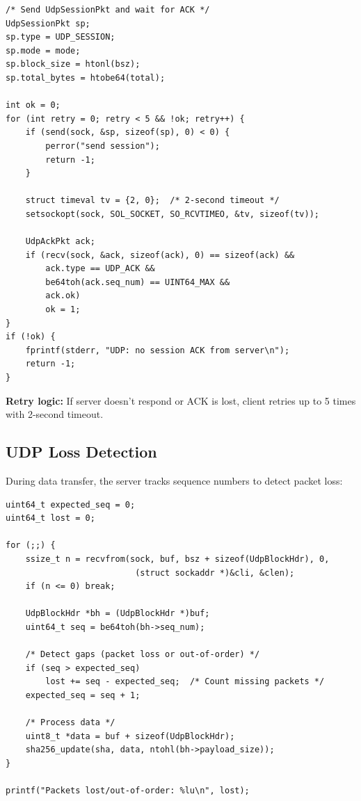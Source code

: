 \documentclass[12pt,a4paper]{article}
\begin{document}
\begin{lstlisting}[caption=UDP Client Session Handshake,label=lst:udp_handshake]
/* Send UdpSessionPkt and wait for ACK */
UdpSessionPkt sp;
sp.type = UDP_SESSION;
sp.mode = mode;
sp.block_size = htonl(bsz);
sp.total_bytes = htobe64(total);

int ok = 0;
for (int retry = 0; retry < 5 && !ok; retry++) {
    if (send(sock, &sp, sizeof(sp), 0) < 0) {
        perror("send session");
        return -1;
    }
    
    struct timeval tv = {2, 0};  /* 2-second timeout */
    setsockopt(sock, SOL_SOCKET, SO_RCVTIMEO, &tv, sizeof(tv));
    
    UdpAckPkt ack;
    if (recv(sock, &ack, sizeof(ack), 0) == sizeof(ack) &&
        ack.type == UDP_ACK &&
        be64toh(ack.seq_num) == UINT64_MAX &&
        ack.ok)
        ok = 1;
}
if (!ok) {
    fprintf(stderr, "UDP: no session ACK from server\n");
    return -1;
}
\end{lstlisting}

\textbf{Retry logic:} If server doesn't respond or ACK is lost, client retries up to 5 times with 2-second timeout.

\subsection{UDP Loss Detection}

During data transfer, the server tracks sequence numbers to detect packet loss:

\begin{lstlisting}[caption=UDP Server Loss Detection,label=lst:udp_loss]
uint64_t expected_seq = 0;
uint64_t lost = 0;

for (;;) {
    ssize_t n = recvfrom(sock, buf, bsz + sizeof(UdpBlockHdr), 0,
                          (struct sockaddr *)&cli, &clen);
    if (n <= 0) break;
    
    UdpBlockHdr *bh = (UdpBlockHdr *)buf;
    uint64_t seq = be64toh(bh->seq_num);
    
    /* Detect gaps (packet loss or out-of-order) */
    if (seq > expected_seq)
        lost += seq - expected_seq;  /* Count missing packets */
    expected_seq = seq + 1;
    
    /* Process data */
    uint8_t *data = buf + sizeof(UdpBlockHdr);
    sha256_update(sha, data, ntohl(bh->payload_size));
}

printf("Packets lost/out-of-order: %lu\n", lost);
\end{lstlisting}
\end{document}
